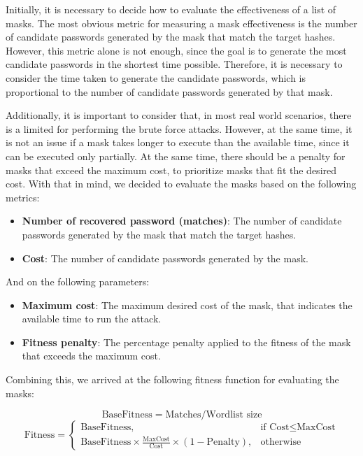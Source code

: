 \documentclass[sigconf,authordraft]{acmart}
\begin{document}
Initially, it is necessary to decide how to evaluate the effectiveness of a list of masks.
The most obvious metric for measuring a mask effectiveness is the number of candidate passwords generated by the mask that match the target hashes.
However, this metric alone is not enough, since the goal is to generate the most candidate passwords in the shortest time possible.
Therefore, it is necessary to consider the time taken to generate the candidate passwords, which is proportional to the number of candidate passwords generated by that mask.

Additionally, it is important to consider that, in most real world scenarios, there is a limited for performing the brute force attacks.
However, at the same time, it is not an issue if a mask takes longer to execute than the available time, since it can be executed only partially.
At the same time, there should be a penalty for masks that exceed the maximum cost, to prioritize masks that fit the desired cost.
With that in mind, we decided to evaluate the masks based on the following metrics:

\begin{itemize}
  \item \textbf{Number of recovered password (matches)}: The number of candidate passwords generated by the mask that match the target hashes.
  \item \textbf{Cost}: The number of candidate passwords generated by the mask.
\end{itemize}

And on the following parameters:

\begin{itemize}
  \item \textbf{Maximum cost}: The maximum desired cost of the mask, that indicates the available time to run the attack.
  \item \textbf{Fitness penalty}: The percentage penalty applied to the fitness of the mask that exceeds the maximum cost.
\end{itemize}

Combining this, we arrived at the following fitness function for evaluating the masks:

\begin{equation}
\label{eq:fitness_function}
  \text{BaseFitness} = \text{Matches} / \text{Wordlist size}
\end{equation}
\begin{equation}
  \text{Fitness} = 
  \begin{cases}
    \text{BaseFitness}, & \text{if Cost} \leq \text{MaxCost} \\
    \text{BaseFitness} \times \frac{\text{MaxCost}}{\text{Cost}} \times ( 1 - \text{Penalty}), & \text{otherwise}
  \end{cases}
\end{equation}
\end{document}
